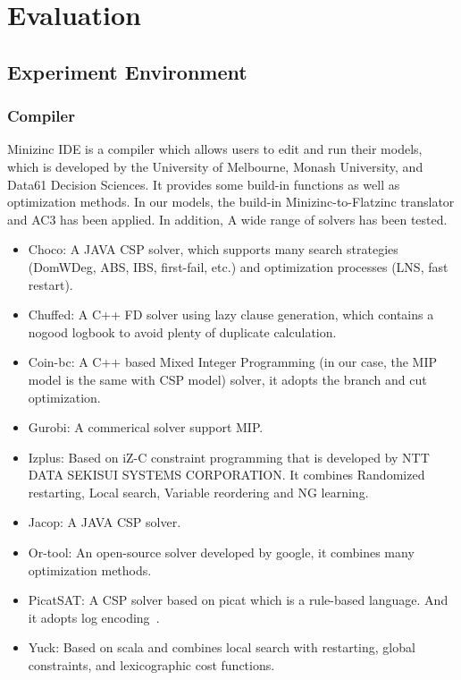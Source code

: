 \chapter{Evaluation}
\label{cha:evaluation}
\section{Experiment Environment}
\subsection{Compiler}
Minizinc IDE is a compiler which allows users to edit and run their models, which is developed by the University of Melbourne, Monash University, and Data61 Decision Sciences\cite{r6}. It provides some build-in functions as well as optimization methods. In our models, the build-in Minizinc-to-Flatzinc translator and AC3 has been applied. In addition, A wide range of solvers has been tested.
\begin{itemize}
    \item Choco: A JAVA CSP solver, which supports many search strategies (DomWDeg, ABS, IBS, first-fail, etc.) and optimization processes (LNS, fast restart).
    \item Chuffed: A C++ FD solver using lazy clause generation, which contains a nogood logbook to avoid plenty of duplicate calculation.
    \item Coin-bc: A C++ based Mixed Integer Programming (in our case, the MIP model is the same with CSP model) solver, it adopts the branch and cut optimization.
    \item Gurobi: A commerical solver support MIP.
    \item Izplus: Based on iZ-C constraint programming that is developed by NTT DATA SEKISUI SYSTEMS CORPORATION. It combines Randomized restarting, Local search, Variable reordering and NG learning.
    \item Jacop: A JAVA CSP solver.
    \item Or-tool: An open-source solver developed by google, it combines many optimization methods.
    \item PicatSAT: A CSP solver based on picat which is a rule-based language. And it adopts log encoding~\cite{r8}.
    \item Yuck: Based on scala and combines local search with restarting, global constraints, and lexicographic cost functions.
\end{itemize}

